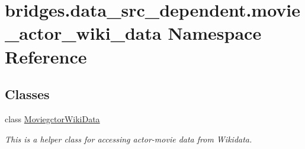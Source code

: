 \hypertarget{namespacebridges_1_1data__src__dependent_1_1movie__actor__wiki__data}{}\section{bridges.\+data\+\_\+src\+\_\+dependent.\+movie\+\_\+actor\+\_\+wiki\+\_\+data Namespace Reference}
\label{namespacebridges_1_1data__src__dependent_1_1movie__actor__wiki__data}
\subsection*{Classes}
\begin{DoxyCompactItemize}
\item 
class \hyperlink{classbridges_1_1data__src__dependent_1_1movie__actor__wiki__data_1_1_moviegctor_wiki_data}{Moviegctor\+Wiki\+Data}
\begin{DoxyCompactList}\small\item\em This is a helper class for accessing actor-\/movie data from Wikidata. \end{DoxyCompactList}\end{DoxyCompactItemize}
